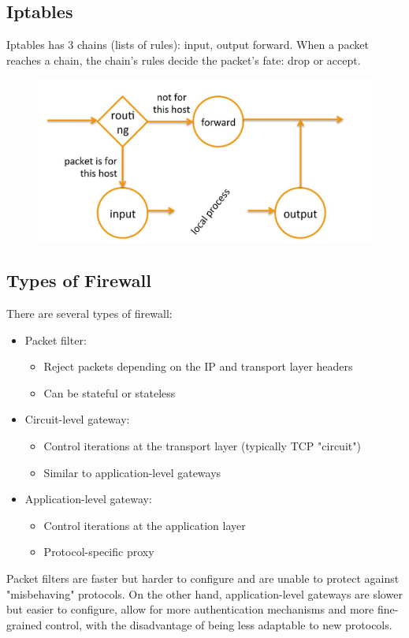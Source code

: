 \documentclass[10pt,a4paper]{report}
\begin{document}
\subsection{Iptables}
Iptables has 3 chains (lists of rules): input, output forward. When a packet reaches a chain, the chain’s rules decide the packet’s fate: drop or accept.
\begin{figure}[H]
\centering
\includegraphics[scale=0.45]{18.png}
\end{figure}
\subsection{Types of Firewall}
There are several types of firewall:
\begin{itemize}
\item Packet filter:
\begin{itemize}
\item Reject packets depending on the IP and transport layer headers
\item Can be stateful or stateless
\end{itemize}
\item Circuit-level gateway:
\begin{itemize}
\item Control iterations at the transport layer (typically TCP "circuit")
\item Similar to application-level gateways
\end{itemize}
\item Application-level gateway:
\begin{itemize}
\item Control iterations at the application layer
\item Protocol-specific proxy
\end{itemize}
\end{itemize}
Packet filters are faster but harder to configure and are unable to protect against "misbehaving" protocols. On the other hand, application-level gateways are slower but easier to configure, allow for more authentication mechanisms and more fine-grained control, with the disadvantage of being less adaptable to new protocols.
\end{document}
